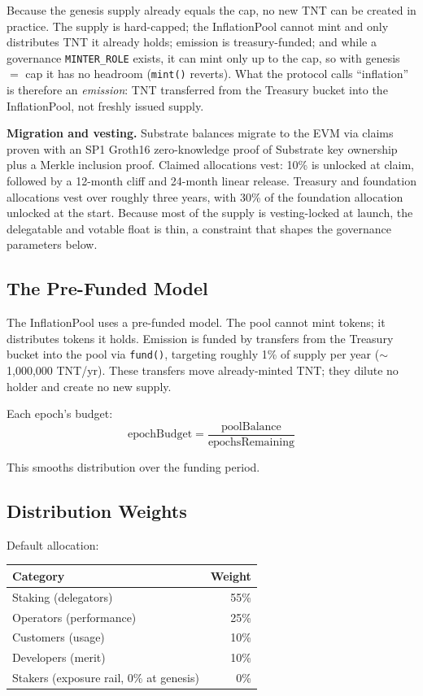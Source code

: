 \documentclass[11pt,a4paper]{article}
\begin{document}
Because the genesis supply already equals the cap, no new TNT can be created in practice. The supply is hard-capped; the InflationPool cannot mint and only distributes TNT it already holds; emission is treasury-funded; and while a governance \texttt{MINTER\_ROLE} exists, it can mint only up to the cap, so with genesis $=$ cap it has no headroom (\texttt{mint()} reverts). What the protocol calls ``inflation'' is therefore an \emph{emission}: TNT transferred from the Treasury bucket into the InflationPool, not freshly issued supply.

\textbf{Migration and vesting.} Substrate balances migrate to the EVM via claims proven with an SP1 Groth16 zero-knowledge proof of Substrate key ownership plus a Merkle inclusion proof. Claimed allocations vest: 10\% is unlocked at claim, followed by a 12-month cliff and 24-month linear release. Treasury and foundation allocations vest over roughly three years, with 30\% of the foundation allocation unlocked at the start. Because most of the supply is vesting-locked at launch, the delegatable and votable float is thin, a constraint that shapes the governance parameters below.

\subsection{The Pre-Funded Model}

The InflationPool uses a pre-funded model. The pool cannot mint tokens; it distributes tokens it holds. Emission is funded by transfers from the Treasury bucket into the pool via \texttt{fund()}, targeting roughly 1\% of supply per year ($\sim$1{,}000{,}000 TNT/yr).
These transfers move already-minted TNT; they dilute no holder and create no new supply.

Each epoch's budget:
\[
\text{epochBudget} = \frac{\text{poolBalance}}{\text{epochsRemaining}}
\]

This smooths distribution over the funding period.

\subsection{Distribution Weights}

Default allocation:
\begin{center}
\begin{tabular}{lr}
\toprule
Category & Weight \\
\midrule
Staking (delegators) & 55\% \\
Operators (performance) & 25\% \\
Customers (usage) & 10\% \\
Developers (merit) & 10\% \\
Stakers (exposure rail, 0\% at genesis) & 0\% \\
\bottomrule
\end{tabular}
\end{center}
\end{document}
